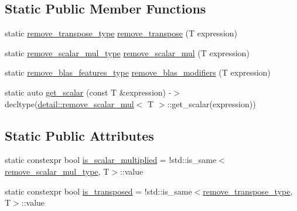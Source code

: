 \subsection*{Static Public Member Functions}
\begin{DoxyCompactItemize}
\item 
static \hyperlink{structBC_1_1tensors_1_1exprs_1_1blas__expression__traits_a527a7e3e800aef6cbaedd8eba5f9ae06}{remove\+\_\+transpose\+\_\+type} \hyperlink{structBC_1_1tensors_1_1exprs_1_1blas__expression__traits_a1b8d7da39f60619d849fd2bfa3d105bd}{remove\+\_\+transpose} (T expression)
\item 
static \hyperlink{structBC_1_1tensors_1_1exprs_1_1blas__expression__traits_a98a1c4a12e066c8ae0109978c366282d}{remove\+\_\+scalar\+\_\+mul\+\_\+type} \hyperlink{structBC_1_1tensors_1_1exprs_1_1blas__expression__traits_ab481089d6702b53269d149ca3446f4dd}{remove\+\_\+scalar\+\_\+mul} (T expression)
\item 
static \hyperlink{structBC_1_1tensors_1_1exprs_1_1blas__expression__traits_aab36f77f1b5168d34fd214124ba46a65}{remove\+\_\+blas\+\_\+features\+\_\+type} \hyperlink{structBC_1_1tensors_1_1exprs_1_1blas__expression__traits_a4f4331e95cfed294a61f500cc567b0ac}{remove\+\_\+blas\+\_\+modifiers} (T expression)
\item 
static auto \hyperlink{structBC_1_1tensors_1_1exprs_1_1blas__expression__traits_a71d795a09d1f5ce18ece7fc8cfee44e4}{get\+\_\+scalar} (const T \&expression) -\/$>$ decltype(\hyperlink{structBC_1_1tensors_1_1exprs_1_1detail_1_1remove__scalar__mul}{detail\+::remove\+\_\+scalar\+\_\+mul}$<$ T $>$\+::get\+\_\+scalar(expression))
\end{DoxyCompactItemize}
\subsection*{Static Public Attributes}
\begin{DoxyCompactItemize}
\item 
static constexpr bool \hyperlink{structBC_1_1tensors_1_1exprs_1_1blas__expression__traits_a483a16790c758498147316641b266f3a}{is\+\_\+scalar\+\_\+multiplied} = !std\+::is\+\_\+same$<$\hyperlink{structBC_1_1tensors_1_1exprs_1_1blas__expression__traits_a98a1c4a12e066c8ae0109978c366282d}{remove\+\_\+scalar\+\_\+mul\+\_\+type}, T$>$\+::value
\item 
static constexpr bool \hyperlink{structBC_1_1tensors_1_1exprs_1_1blas__expression__traits_a038605b8d8a7a49c82e6e5eb167e63be}{is\+\_\+transposed} = !std\+::is\+\_\+same$<$\hyperlink{structBC_1_1tensors_1_1exprs_1_1blas__expression__traits_a527a7e3e800aef6cbaedd8eba5f9ae06}{remove\+\_\+transpose\+\_\+type}, T$>$\+::value
\end{DoxyCompactItemize}


